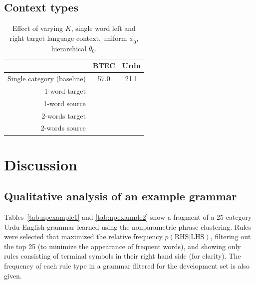 \subsection{Context types}

\begin{table}[h]
\caption{Effect of varying $K$, single word left and right target language context, uniform $\phi_0$, hierarchical $\theta_0$.}
\begin{center}
\begin{tabular}{r|c|c}
& BTEC & Urdu \\
\hline
Single category (baseline) & 57.0 & 21.1 \\
\hline
1-word target &  & \\
1-word source &  & \\
2-words target & & \\
2-words source & & \\
\end{tabular}
\end{center}
\label{tab:npbaselines}
\end{table}%



\section{Discussion}

\subsection{Qualitative analysis of an example grammar}

Tables~\ref{tab:npexample1} and \ref{tab:npexample2} show a fragment of a 25-category Urdu-English grammar learned using the nonparametric phrase clustering.  Rules were selected that maximized the relative frequency $p(\textrm{RHS}|\textrm{LHS})$, filtering out the top 25 (to minimize the appearance of frequent words), and showing only rules consisting of terminal symbols in their right hand side (for clarity). The frequency of each rule type in a grammar filtered for the development set is also given.

